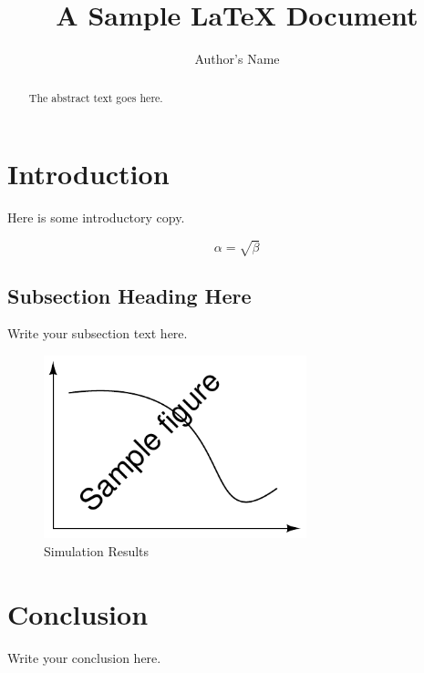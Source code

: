 \documentclass{article}
\begin{document}
\title{A Sample \LaTeX{} Document}
\author{Author's Name}

\maketitle

\begin{abstract}
The abstract text goes here.
\end{abstract}

\section{Introduction}
Here is some introductory copy.

\begin{equation}
    \label{simple_equation}
    \alpha = \sqrt{ \beta }
\end{equation}

\subsection{Subsection Heading Here}
Write your subsection text here.

\begin{figure}
    \centering
    \includegraphics[width=3.0in]{test/figure}
    \caption{Simulation Results}
    \label{simulationfigure}
\end{figure}

\section{Conclusion}
Write your conclusion here.
\end{document}
